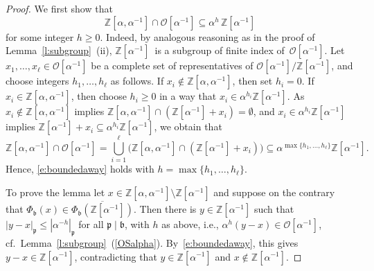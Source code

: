 \documentclass[12pt]{amsart}
\theoremstyle{definition}
\theoremstyle{remark}
\numberwithin{equation}{section}
\begin{document}
\begin{proof}
We first show that 
\begin{equation} \label{e:boundedaway}
\mathbb{Z}[\alpha,\alpha^{-1}] \cap \mathcal{O}[\alpha^{-1}] \subseteq \alpha^h\, \mathbb{Z}[\alpha^{-1}]
\end{equation} 
for some integer $h \ge 0$.
Indeed, by analogous reasoning as in the proof of Lemma~\ref{l:subgroup}~(ii), $\mathbb{Z}[\alpha^{-1}]$~is a subgroup of finite index of~$\mathcal{O}[\alpha^{-1}]$.
Let $x_1,\ldots, x_\ell \in \mathcal{O}[\alpha^{-1}]$ be a complete set of representatives of $\mathcal{O}[\alpha^{-1}] / \mathbb{Z}[\alpha^{-1}]$, and choose integers $h_1,\ldots, h_\ell$ as follows. 
If $x_i \not\in \mathbb{Z}[\alpha,\alpha^{-1}]$, then set $h_i = 0$. 
If $x_i \in \mathbb{Z}[\alpha,\alpha^{-1}]$, then choose $h_i \ge 0$ in a way that $x_i \in \alpha^{h_i} \mathbb{Z}[\alpha^{-1}]$. 
As $x_i \not\in \mathbb{Z}[\alpha,\alpha^{-1}]$ implies $\mathbb{Z}[\alpha,\alpha^{-1}] \cap (\mathbb{Z}[\alpha^{-1}] + x_i) = \emptyset$, and $x_i \in \alpha^{h_i} \mathbb{Z}[\alpha^{-1}]$ implies $\mathbb{Z}[\alpha^{-1}] + x_i \subseteq \alpha^{h_i} \mathbb{Z}[\alpha^{-1}]$, we obtain that
\[
\mathbb{Z}[\alpha, \alpha^{-1}] \cap \mathcal{O}[\alpha^{-1}] = \bigcup_{i=1}^\ell \big(\mathbb{Z}[\alpha,\alpha^{-1}] \cap (\mathbb{Z}[\alpha^{-1}] + x_i)\big) \subseteq \alpha^{\max\{h_1,\ldots,h_\ell\}} \mathbb{Z}[\alpha^{-1}].
\]
Hence, \eqref{e:boundedaway} holds with $h = \max\{h_1,\ldots,h_\ell\}$.

To prove the lemma let $x \in \mathbb{Z}[\alpha,\alpha^{-1}] \setminus \mathbb{Z}[\alpha^{-1}]$ and suppose on the contrary that $\Phi_\mathfrak{b}(x) \in \overline{\Phi_\mathfrak{b}(\mathbb{Z}[\alpha^{-1}])}$.
Then there is $y \in \mathbb{Z}[\alpha^{-1}]$ such that $|y - x|_\mathfrak{p} \le |\alpha^{-h}|_\mathfrak{p}$ for all $\mathfrak{p} \mid \mathfrak{b}$, with $h$ as above, i.e., $\alpha^h (y-x) \in \mathcal{O}[\alpha^{-1}]$, cf.\ Lemma~\ref{l:subgroup}~(\ref{OSalpha}).
By~\eqref{e:boundedaway}, this gives $y-x \in \mathbb{Z}[\alpha^{-1}]$, contradicting that $y \in \mathbb{Z}[\alpha^{-1}]$ and $x \notin \mathbb{Z}[\alpha^{-1}]$.
\end{proof}
\end{document}
